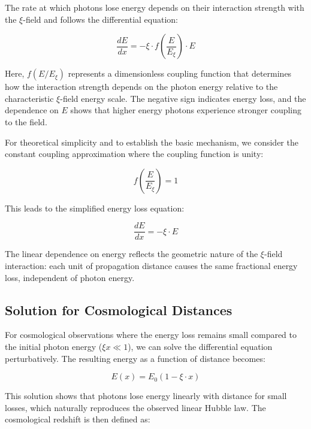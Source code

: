 	The rate at which photons lose energy depends on their interaction strength with the $\xi$-field and follows the differential equation:
	
	\begin{equation}
		\frac{dE}{dx} = -\xi \cdot f\left(\frac{E}{E_\xi}\right) \cdot E
	\end{equation}
	
	Here, $f(E/E_\xi)$ represents a dimensionless coupling function that determines how the interaction strength depends on the photon energy relative to the characteristic $\xi$-field energy scale. The negative sign indicates energy loss, and the dependence on $E$ shows that higher energy photons experience stronger coupling to the field.
	
	For theoretical simplicity and to establish the basic mechanism, we consider the constant coupling approximation where the coupling function is unity:
	
	\begin{equation}
		f\left(\frac{E}{E_\xi}\right) = 1
	\end{equation}
	
	This leads to the simplified energy loss equation:
	
	\begin{equation}
		\frac{dE}{dx} = -\xi \cdot E
	\end{equation}
	
	The linear dependence on energy reflects the geometric nature of the $\xi$-field interaction: each unit of propagation distance causes the same fractional energy loss, independent of photon energy.
	
	\subsection{Solution for Cosmological Distances}
	
	For cosmological observations where the energy loss remains small compared to the initial photon energy ($\xi x \ll 1$), we can solve the differential equation perturbatively. The resulting energy as a function of distance becomes:
	
	\begin{equation}
		E(x) = E_0 \left(1 - \xi \cdot x\right)
	\end{equation}
	
	This solution shows that photons lose energy linearly with distance for small losses, which naturally reproduces the observed linear Hubble law. The cosmological redshift is then defined as:
	
